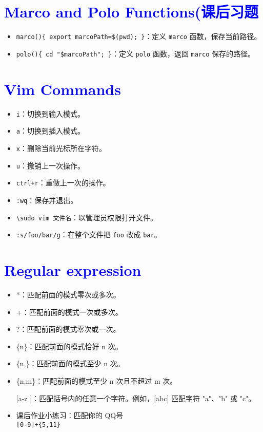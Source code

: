 \documentclass{article}
\begin{document}
\section{\textcolor{blue}{Marco and Polo Functions(课后习题}}
\begin{itemize}
    \item \texttt{marco()\{ export marcoPath=\$(pwd); \}}：定义 \texttt{marco} 函数，保存当前路径。
    \item \texttt{polo()\{ cd "\$marcoPath"; \}}：定义 \texttt{polo} 函数，返回 \texttt{marco} 保存的路径。
\end{itemize}

\section{\textcolor{blue}{Vim Commands}}
\begin{itemize}
\begin{figure}[htbp]
    \centering
    \texttt{[image: picturevim.png]}
    \caption{Elliptic Paraboloid}
    \end{figure} 
    \item \texttt{i}：切换到输入模式。
    \item \texttt{a}：切换到插入模式。
    \item \texttt{x}：删除当前光标所在字符。
    \item \texttt{u}：撤销上一次操作。
    \item \texttt{ctrl+r}：重做上一次的操作。
    \item \texttt{:wq}：保存并退出。
    \item \texttt{\textbackslash sudo vim 文件名}：以管理员权限打开文件。
    \item \texttt{:s/foo/bar/g}：在整个文件把 \texttt{foo} 改成 \texttt{bar}。
    
\end{itemize}
\section{\textcolor{blue}{Regular expression}}
\begin{itemize}
  \item *：匹配前面的模式零次或多次。
  \item +：匹配前面的模式一次或多次。
  \item?：匹配前面的模式零次或一次。
  \item \{n\}：匹配前面的模式恰好 n 次。
  \item \{n,\}：匹配前面的模式至少 n 次。
  \item \{n,m\}：匹配前面的模式至少 n 次且不超过 m 次。
  \item [[a-z]]：匹配括号内的任意一个字符。例如，[abc] 匹配字符 "a"、"b" 或 "c"。 
  \item 课后作业小练习：匹配你的 QQ号 \\ \texttt{[0-9]+\{5,11\}}
\end{itemize}
\end{document}
